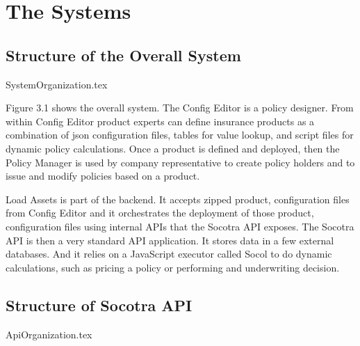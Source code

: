 \chapter{The Systems}
\label{intro:04} %


\section{Structure of the Overall System}
\label{sec:04:1}

{SystemOrganization.tex}

Figure 3.1 shows the overall system. The Config Editor is a policy designer. From within Config
Editor product experts can define insurance products as a combination of json configuration
files, tables for value lookup, and script files for dynamic policy calculations. Once a product
is defined and deployed, then the Policy Manager is used by company representative to create
policy holders and to issue and modify policies based on a product.

Load Assets is part of the backend. It accepts zipped product, configuration files from Config Editor and
it orchestrates the deployment of those product, configuration files using internal APIs that the
Socotra API exposes. The Socotra API is then a very standard API application. It stores data in
a few external databases. And it relies on a JavaScript executor called Socol to do dynamic calculations,
such as pricing a policy or performing and underwriting decision.

\section{Structure of Socotra API}
\label{sec:04:2}
{ApiOrganization.tex}

